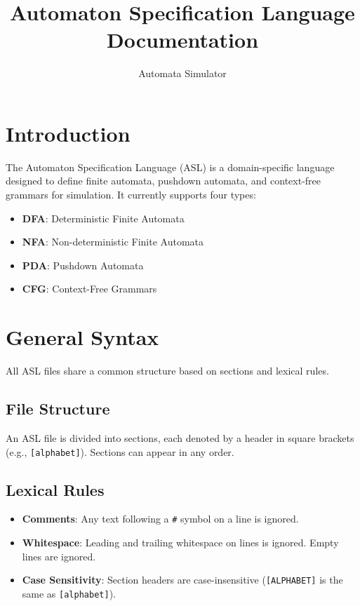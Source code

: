 \documentclass{article}
\title{Automaton Specification Language Documentation}
\author{Automata Simulator}
\date{}
\begin{document}
\maketitle
\tableofcontents
\clearpage

\section{Introduction}
The Automaton Specification Language (ASL) is a domain-specific language designed to define finite automata, pushdown automata, and context-free grammars for simulation. It currently supports four types:
\begin{itemize}
    \item \textbf{DFA}: Deterministic Finite Automata
    \item \textbf{NFA}: Non-deterministic Finite Automata
    \item \textbf{PDA}: Pushdown Automata
    \item \textbf{CFG}: Context-Free Grammars
\end{itemize}

\section{General Syntax}
All ASL files share a common structure based on sections and lexical rules.

\subsection{File Structure}
An ASL file is divided into sections, each denoted by a header in square brackets (e.g., \texttt{[alphabet]}). Sections can appear in any order.

\subsection{Lexical Rules}
\begin{itemize}
    \item \textbf{Comments}: Any text following a \texttt{\#} symbol on a line is ignored.
    \item \textbf{Whitespace}: Leading and trailing whitespace on lines is ignored. Empty lines are ignored.
    \item \textbf{Case Sensitivity}: Section headers are case-insensitive (\texttt{[ALPHABET]} is the same as \texttt{[alphabet]}).
\end{itemize}
\end{document}
